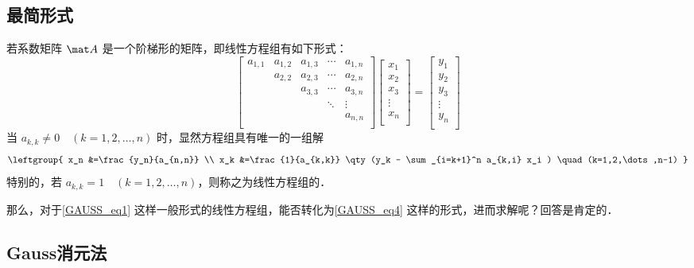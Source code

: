 \subsection{最简形式}
若系数矩阵 $\mat A$ 是一个阶梯形的矩阵，即线性方程组有如下形式：
\begin{equation}\label{GAUSS_eq4}
{
	\left[ \begin{matrix}
	a_{1,1} &a_{1,2} &a_{1,3} &\cdots &a_{1,n} \\
	        &a_{2,2} &a_{2,3} &\cdots &a_{2,n} \\
	        &        &a_{3,3} &\cdots &a_{3,n} \\
             &        &        &\ddots &\vdots  \\
	        &        &        &       &a_{n,n} \\
	\end{matrix} 
	\right ]}
{
	\left[ \begin{matrix}
	x_1 \\
	x_2 \\
     x_3 \\
     \vdots \\
	x_n \\
	\end{matrix} 
	\right ]}=
{
	\left[ \begin{matrix}
	y_1 \\
	y_2 \\
     y_3 \\
     \vdots \\
	y_n \\
	\end{matrix} 
	\right ]}
\end{equation}
当 $a_{k,k}\neq 0 \quad (k=1,2,\dots,n)$ 时，显然方程组具有唯一的一组解
\begin{equation}\label{GAUSS_eq5}
\leftgroup{
x_n &=\frac{y_n}{a_{n,n}} \\
x_k &=\frac{1}{a_{k,k}} \qty(y_k - \sum_{i=k+1}^n a_{k,i} x_i ) \quad (k=1,2,\dots,n-1) }\\
\end{equation}
特别的，若 $a_{k,k} = 1 \quad (k=1,2,\dots,n)$，则称之为线性方程组的．

那么，对于\autoref{GAUSS_eq1} 这样一般形式的线性方程组，能否转化为\autoref{GAUSS_eq4} 这样的形式，进而求解呢？回答是肯定的． %

\subsection{Gauss消元法}

